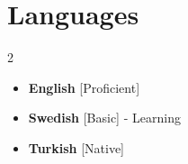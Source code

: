 \documentclass[11pt,a4paper,sans]{moderncv}
\begin{document}
\section{Languages}
\begin{multicols}{2}
\begin{itemize}[label=\textbullet]
\item \textbf{English} [Proficient]
\item {\textbf{Swedish} [Basic] - Learning}
\item {\textbf{Turkish} [Native]}
\end{itemize}
\end{multicols}
\end{document}
